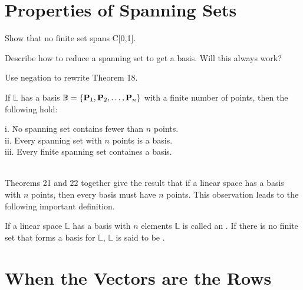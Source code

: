 \section{Properties of Spanning Sets}    \label{Properties ofSpanning Sets}

\begin{myexa}[\bd{a}]
	Show that no finite set spans C[0,1].
\end{myexa}

\begin{myexb}[\bd{b}]
	Describe how to reduce a spanning set to get a basis. Will this always work?
\end{myexb}

\begin{myexc}[\bd{c}]
	Use negation to rewrite Theorem 18.
\end{myexc}

\begin{theorem}
    If $\mathbb{L}$ has a basis $\mathbb{B} = \{ \textbf{P}_1, \textbf{P}_2,\ldots,\textbf{P}_n \}$ with a finite number of points, then the following hold:
    \begin{tabbing}
    	\indent i. \quad  \= No spanning set contains fewer than $n$ points.\\
    	\indent ii.\> Every spanning set with $n$ points is a basis.\\ 
    	\indent iii. \> Every finite spanning set containes a basis.
    \end{tabbing}
\end{theorem}
\vspace{-.3in}\hspace{5in}\begin{annotation}
\end{annotation}
\\

Theorems 21 and 22 together give the result that if a linear space has a basis with $n$ points, then every basis must have $n$ points. This observation leads to the following important definition. 


\begin{defn}
	If a linear space $\mathbb{L}$ has a basis with $n$ elements  $\mathbb{L}$ is called an . If there is no finite set that forms a basis for $\mathbb{L}$,  $\mathbb{L}$ is said to be .
\end{defn}

\section{When the Vectors are the Rows}    \label{When the vectors are the Rows}

